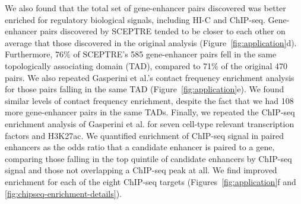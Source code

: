 \documentclass{nature}
\begin{document}
We also found that the total set of gene-enhancer pairs discovered was better enriched for regulatory biological signals, including HI-C and ChIP-seq. Gene-enhancer pairs discovered by SCEPTRE tended to be closer to each other on average that those discovered in the original analysis (Figure~\ref{fig:application}d). Furthermore, 76\% of SCEPTRE's 585 gene-enhancer pairs fell in the same topologically associating domain (TAD), compared to 71\% of the original 470 pairs. We also repeated Gasperini et al.'s contact frequency enrichment analysis for those pairs falling in the same TAD (Figure~\ref{fig:application}e). We found similar levels of contact frequency enrichment, despite the fact that we had 108 more gene-enhancer pairs in the same TADs. Finally, we repeated the ChIP-seq enrichment analysis of Gasperini et al. for seven cell-type relevant transcription factors and H3K27ac. We quantified enrichment of ChIP-seq signal in paired enhancers as the odds ratio that a candidate enhancer is paired to a gene, comparing those falling in the top quintile of candidate enhancers by ChIP-seq signal and those not overlapping a ChIP-seq peak at all. We find improved enrichment for each of the eight ChIP-seq targets (Figures~\ref{fig:application}f and \ref{fig:chipseq-enrichment-details}).

\clearpage
{}
\thispagestyle{empty} 
\addtocounter{page}{-1}
\vspace{-2in}
\end{document}
